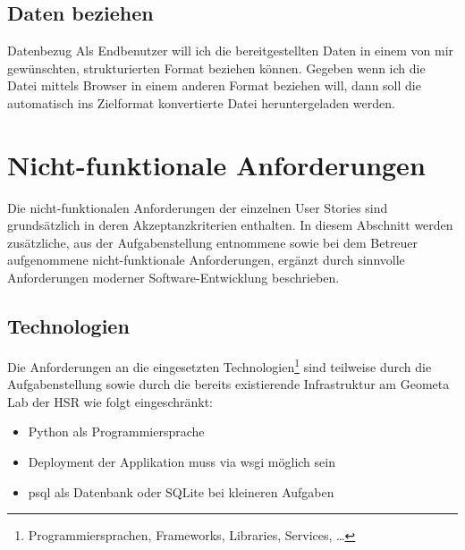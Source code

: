 \subsection{Daten beziehen}

\begin{scrumepic}[label=epic:pd:datenbezug]{Datenbezug}
	Als Endbenutzer will ich die bereitgestellten Daten in einem von mir gewünschten, strukturierten Format beziehen können.
	\storyacceptance	
	Gegeben
	wenn ich die Datei mittels Browser in einem anderen Format beziehen will, dann soll die automatisch ins Zielformat konvertierte Datei heruntergeladen werden.
\end{scrumepic}

\xxx[stories]



\section{Nicht-funktionale Anforderungen}

Die nicht-funktionalen Anforderungen der einzelnen User Stories sind grundsätzlich in deren Akzeptanzkriterien enthalten.
In diesem Abschnitt werden zusätzliche, aus der Aufgabenstellung entnommene sowie bei dem Betreuer aufgenommene nicht-funktionale Anforderungen, ergänzt durch sinnvolle Anforderungen moderner Software-Entwicklung beschrieben.

\subsection{Technologien}
Die Anforderungen an die eingesetzten Technologien\footnote{Programmiersprachen, Frameworks, Libraries, Services, \dots} sind teilweise durch die Aufgabenstellung sowie durch die bereits existierende Infrastruktur am Geometa Lab der HSR wie folgt eingeschränkt:

\begin{itemize}
	\item Python als Programmiersprache %
	\item Deployment der Applikation muss via \gls{wsgi} möglich sein
	\item \gls{psql} als Datenbank oder SQLite bei kleineren Aufgaben
\end{itemize}


